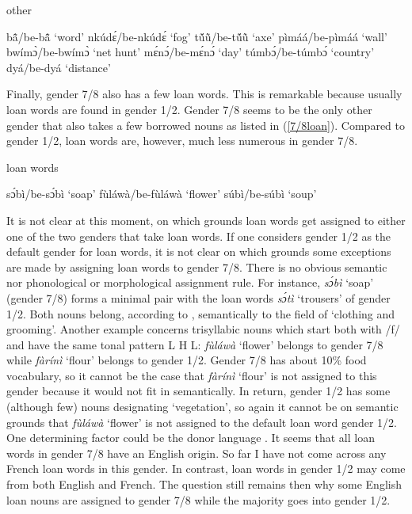 \begin{exe}
\ex\label{7/8other} other
\begin{xlist}
\ex bã̂/be-bã̂ `word'
\ex nkúdɛ́/be-nkúdɛ́ `fog'
\ex tṹũ̀/be-tṹũ̀ `axe'
\ex pìmáá/be-pìmáá `wall'
\ex bwímɔ̀/be-bwímɔ̀ `net hunt'
\ex mɛ́nɔ́/be-mɛ́nɔ́ `day'
\ex túmbɔ́/be-túmbɔ́ `country'
\ex dyá/be-dyá `distance'
\end{xlist}
\end{exe}

\noindent Finally, gender 7/8 also has a few loan words. This is remarkable because usually loan words are found in gender 1/2. Gender 7/8 seems to be the only other gender that also takes a few borrowed nouns as listed in (\ref{7/8loan}). Compared to gender 1/2, loan words are, however, much less numerous in gender 7/8. 

\begin{exe}
\ex\label{7/8loan} loan words
\begin{xlist}
\ex sɔ́bì/be-sɔ́bì `soap'
\ex fùláwà/be-fùláwà `flower'
\ex súbì/be-súbì `soup'
\end{xlist}
\end{exe}

\noindent It is not clear at this moment, on which grounds loan words get assigned to either one of the two genders that take loan words. If one considers gender 1/2 as the default gender for loan words, it is not clear on which grounds some exceptions are made by assigning loan words to gender 7/8. There is no obvious semantic nor phonological or morphological assignment rule. For instance, {\itshape sɔ́bì} `soap' (gender 7/8) forms a minimal pair with the loan words {\itshape sɔ́tì} `trousers' of gender 1/2. Both nouns belong, according to \citet{haspelmath2009}, semantically to the field of `clothing and grooming'. Another example concerns trisyllabic nouns which start both with /f/ and have the same tonal pattern L H L: {\itshape fùláwà} `flower' belongs to gender 7/8 while {\itshape fàrínì} `flour' belongs to gender 1/2. Gender 7/8 has about 10\% food vocabulary, so it cannot be the case that {\itshape fàrínì} `flour' is not assigned to this gender because it would not fit in semantically. In return, gender 1/2 has some (although few) nouns designating `vegetation', so again it cannot be on semantic grounds that {\itshape fùláwà} `flower' is not assigned to the default loan word gender 1/2. One determining factor could be the donor language . It seems that all loan words in gender 7/8 have an English origin. So far I have not come across any French loan words in this gender. In contrast, loan words in gender 1/2 may come from both English and French. The question still remains then why some English loan nouns are assigned to gender 7/8 while the majority goes into gender 1/2.

